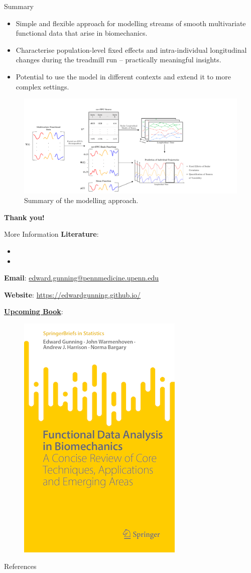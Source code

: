 \documentclass[aspectratio=128,xcolor=dvipsnames, notes]{beamer}
\newcommand{\1}{\mathbf{1}}
\begin{document}
\begin{frame}{Summary}
\begin{itemize}
    \item Simple and flexible approach for modelling streams of smooth multivariate functional data that arise in biomechanics.
    \item Characterise population-level fixed effects and intra-individual longitudinal changes during the treadmill run -- practically meaningful insights.
    \item Potential to use the model in different contexts and extend it to more complex settings.
\end{itemize}
\begin{figure}
    \centering
    \includegraphics[width=0.65\linewidth]{methods-schematic.pdf}
    \caption{Summary of the modelling approach.}
    \label{fig:enter-label}
\end{figure}
\end{frame}

\begin{frame}
    \vfill
    \Huge{\centerline{\textbf{Thank you!}}}
    \vfill
\end{frame}




\begin{frame}{More Information}
\small
   \textbf{Literature}:
   \begin{itemize}
       \item {}
       \item {}
   \end{itemize}
\textbf{Email}: \href{mailto:edward.gunning@pennmedicine.upenn.edu}{edward.gunning@pennmedicine.upenn.edu}


\textbf{Website}: \url{https://edwardgunning.github.io/}   
   
\textbf{\href{https://link.springer.com/book/9783031688614}{Upcoming Book}}:
   \begin{figure}
       \centering
       \includegraphics[width=0.175\linewidth]{figures/book_frontcover.png}
       \label{fig:enter-label}
   \end{figure}
\end{frame}

\begin{frame}{References}
       \printbibliography
\end{frame}
\end{document}
